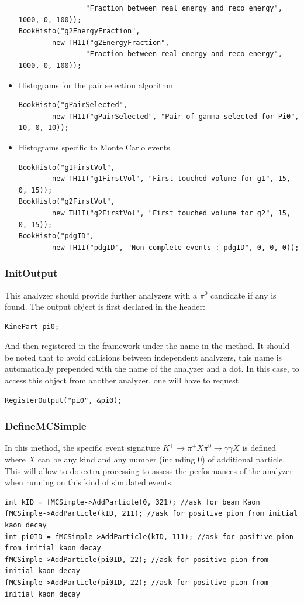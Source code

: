 \begin{itemize}
\begin{lstlisting}
				"Fraction between real energy and reco energy",	1000, 0, 100));
BookHisto("g2EnergyFraction", 
		new TH1I("g2EnergyFraction", 
				"Fraction between real energy and reco energy",	1000, 0, 100));
\end{lstlisting}
	\item Histograms for the pair selection algorithm
\begin{lstlisting}
BookHisto("gPairSelected", 
		new TH1I("gPairSelected", "Pair of gamma selected for Pi0", 10, 0, 10));
\end{lstlisting}
	\item Histograms specific to Monte Carlo events
\begin{lstlisting}
BookHisto("g1FirstVol", 
		new TH1I("g1FirstVol", "First touched volume for g1", 15, 0, 15));
BookHisto("g2FirstVol", 
		new TH1I("g2FirstVol", "First touched volume for g2", 15, 0, 15));
BookHisto("pdgID", 
		new TH1I("pdgID", "Non complete events : pdgID", 0, 0, 0));
\end{lstlisting}
\end{itemize}

\subsubsection{InitOutput}
This analyzer should provide further analyzers with a $\pi^0$ candidate if any is found. The output
object is first declared in the header:

\begin{lstlisting}
KinePart pi0;
\end{lstlisting}

And then registered in the framework under the name  in the 
method. It should be noted that to avoid collisions between independent analyzers, this name is
automatically prepended with the name of the analyzer and a dot. In this case, to access this
object from another analyzer, one will have to request 
\begin{lstlisting}
RegisterOutput("pi0", &pi0);
\end{lstlisting}

\subsubsection{DefineMCSimple}
In this method, the specific event signature $K^+\to\pi^+X\pi^0\to\gamma\gamma X$ is defined where
$X$ can be any kind and any number (including 0) of additional particle. This will allow to do
extra-processing to assess the performances of the analyzer when running on this kind of
simulated events.
\begin{lstlisting}
int kID = fMCSimple->AddParticle(0, 321); //ask for beam Kaon
fMCSimple->AddParticle(kID, 211); //ask for positive pion from initial kaon decay
int pi0ID = fMCSimple->AddParticle(kID, 111); //ask for positive pion from initial kaon decay
fMCSimple->AddParticle(pi0ID, 22); //ask for positive pion from initial kaon decay
fMCSimple->AddParticle(pi0ID, 22); //ask for positive pion from initial kaon decay
\end{lstlisting}


